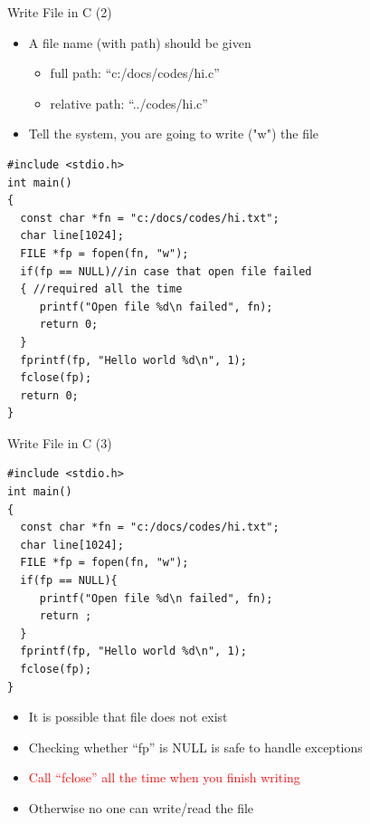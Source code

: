 \begin{frame}[fragile]{Write File in C (2)}
\vspace{-0.15in}
\begin{itemize}
	\item {A file name (with path) should be given}
	\begin{itemize}
		\item {full path: ``c:/docs/codes/hi.c''}
		\item {relative path: ``../codes/hi.c''}
	\end{itemize}
	\item {Tell the system, you are going to write ("w") the file}
\end{itemize}
\begin{lstlisting}[xleftmargin=0.06\linewidth, linewidth=0.85\linewidth]
#include <stdio.h>
int main()
{
  const char *fn = "c:/docs/codes/hi.txt";
  char line[1024];
  FILE *fp = fopen(fn, "w");
  if(fp == NULL)//in case that open file failed
  { //required all the time
     printf("Open file %d\n failed", fn);
     return 0;
  }
  fprintf(fp, "Hello world %d\n", 1);
  fclose(fp); 
  return 0;
}
\end{lstlisting}
\end{frame}

\begin{frame}[fragile]{Write File in C (3)}
\vspace{-0.15in}
\begin{lstlisting}[xleftmargin=0.06\linewidth, linewidth=0.85\linewidth]
#include <stdio.h>
int main()
{
  const char *fn = "c:/docs/codes/hi.txt";
  char line[1024];
  FILE *fp = fopen(fn, "w");
  if(fp == NULL){
     printf("Open file %d\n failed", fn);
     return ;
  }
  fprintf(fp, "Hello world %d\n", 1);
  fclose(fp); 
}
\end{lstlisting}
\vspace{-0.2in}
\begin{itemize}
	\item {It is possible that file does not exist}
	\item {Checking whether ``fp'' is NULL is safe to handle exceptions}
	\item {\textcolor{red}{Call ``fclose'' all the time when you finish writing}}
	\item {Otherwise no one can write/read the file}
\end{itemize}
\end{frame}

